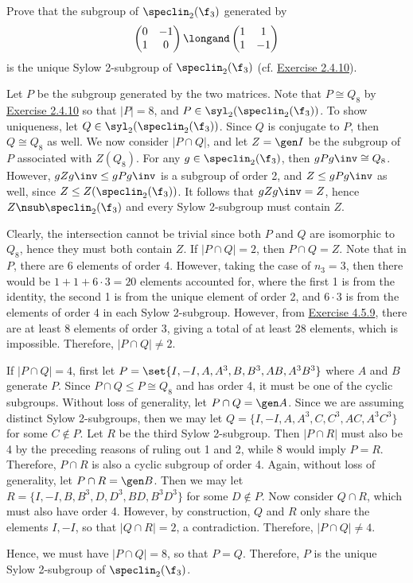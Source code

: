 \begin{exercise}\label{ex4.5.10}
	Prove that the subgroup of $\speclin_2(\f_3)$ generated by
	\[
	\begin{pmatrix}
		0 & -1 \\
		1 & 0
	\end{pmatrix} \longand
	\begin{pmatrix}
		1 & 1 \\
		1 & -1
	\end{pmatrix}\]
	is the unique Sylow 2-subgroup of $\speclin_2(\f_3)$ (cf. \hyperref[ex2.4.10]{Exercise 2.4.10}).
\end{exercise}

\begin{sol}
	Let $P$ be the subgroup generated by the two matrices. Note that $P \cong Q_8$ by \hyperref[ex2.4.10]{Exercise 2.4.10} so that $|P| = 8$, and $P \in \syl_2(\speclin_2(\f_3))$. To show uniqueness, let $Q \in \syl_2(\speclin_2(\f_3))$. Since $Q$ is conjugate to $P$, then $Q \cong Q_8$ as well. We now consider $|P \cap Q|$, and let $Z = \gen I$ be the subgroup of $P$ associated with $Z(Q_8)$. For any $g \in \speclin_2(\f_3)$, then $gPg\inv \cong Q_8$. However, $gZg\inv \leq gPg\inv$ is a subgroup of order 2, and $Z \leq gPg\inv$ as well, since $Z \leq Z(\speclin_2(\f_3))$. It follows that $gZg\inv = Z$, hence $Z \nsub \speclin_2(\f_3)$ and every Sylow 2-subgroup must contain $Z$.

	Clearly, the intersection cannot be trivial since both $P$ and $Q$ are isomorphic to $Q_8$, hence they must both contain $Z$. If $|P \cap Q| = 2$, then $P \cap Q = Z$. Note that in $P$, there are 6 elements of order 4. However, taking the case of $n_3 = 3$, then there would be $1 + 1 + 6 \cdot 3 = 20$ elements accounted for, where the first 1 is from the identity, the second 1 is from the unique element of order 2, and $6 \cdot 3$ is from the elements of order 4 in each Sylow 2-subgroup. However, from \hyperref[ex4.5.9]{Exercise 4.5.9}, there are at least 8 elements of order 3, giving a total of at least 28 elements, which is impossible. Therefore, $|P \cap Q| \neq 2$.

	If $|P \cap Q| = 4$, first let $P = \set{I, -I, A, A^3, B, B^3, AB, A^3B^3}$ where $A$ and $B$ generate $P$. Since $P \cap Q \leq P \cong Q_8$ and has order 4, it must be one of the cyclic subgroups. Without loss of generality, let $P \cap Q = \gen A$. Since we are assuming distinct Sylow 2-subgroups, then we may let $Q = \{I, -I, A, A^3, C, C^3, AC, A^3C^3\}$ for some $C \not\in P$. Let $R$ be the third Sylow 2-subgroup. Then $|P \cap R|$ must also be 4 by the preceding reasons of ruling out 1 and 2, while 8 would imply $P = R$. Therefore, $P \cap R$ is also a cyclic subgroup of order 4. Again, without loss of generality, let $P \cap R = \gen B$. Then we may let $R = \{I, -I, B, B^3, D, D^3, BD, B^3D^3\}$ for some $D \not\in P$. Now consider $Q \cap R$, which must also have order 4. However, by construction, $Q$ and $R$ only share the elements $I, -I$, so that $|Q \cap R| = 2$, a contradiction. Therefore, $|P \cap Q| \neq 4$.

	Hence, we must have $|P \cap Q| = 8$, so that $P = Q$. Therefore, $P$ is the unique Sylow 2-subgroup of $\speclin_2(\f_3)$.
\end{sol}

